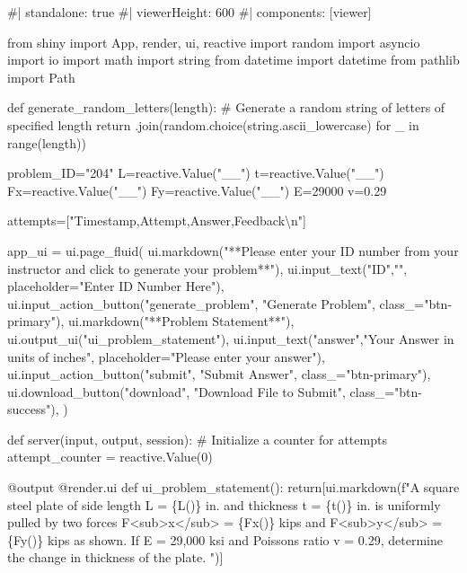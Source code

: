 \documentclass[
  letterpaper,
  DIV=11,
  numbers=noendperiod]{scrreprt}
\newenvironment{Shaded}{\begin{snugshade}}{\end{snugshade}}
\newcommand{\NormalTok}[1]{\textcolor[rgb]{0.00,0.23,0.31}{#1}}
\begin{document}
\begin{Shaded}
\begin{Highlighting}[]
\NormalTok{\#| standalone: true}
\NormalTok{\#| viewerHeight: 600}
\NormalTok{\#| components: [viewer]}

\NormalTok{from shiny import App, render, ui, reactive}
\NormalTok{import random}
\NormalTok{import asyncio}
\NormalTok{import io}
\NormalTok{import math}
\NormalTok{import string}
\NormalTok{from datetime import datetime}
\NormalTok{from pathlib import Path}

\NormalTok{def generate\_random\_letters(length):}
\NormalTok{    \# Generate a random string of letters of specified length}
\NormalTok{    return \textquotesingle{}\textquotesingle{}.join(random.choice(string.ascii\_lowercase) for \_ in range(length)) }

\NormalTok{problem\_ID="204"}
\NormalTok{L=reactive.Value("\_\_")}
\NormalTok{t=reactive.Value("\_\_")}
\NormalTok{Fx=reactive.Value("\_\_")}
\NormalTok{Fy=reactive.Value("\_\_")}
\NormalTok{E=29000}
\NormalTok{v=0.29}


\NormalTok{attempts=["Timestamp,Attempt,Answer,Feedback\textbackslash{}n"]}

\NormalTok{app\_ui = ui.page\_fluid(}
\NormalTok{    ui.markdown("**Please enter your ID number from your instructor and click to generate your problem**"),}
\NormalTok{    ui.input\_text("ID","", placeholder="Enter ID Number Here"),}
\NormalTok{    ui.input\_action\_button("generate\_problem", "Generate Problem", class\_="btn{-}primary"),}
\NormalTok{    ui.markdown("**Problem Statement**"),}
\NormalTok{    ui.output\_ui("ui\_problem\_statement"),}
\NormalTok{    ui.input\_text("answer","Your Answer in units of inches", placeholder="Please enter your answer"),}
\NormalTok{    ui.input\_action\_button("submit", "Submit Answer", class\_="btn{-}primary"),}
\NormalTok{    ui.download\_button("download", "Download File to Submit", class\_="btn{-}success"),}
\NormalTok{)}


\NormalTok{def server(input, output, session):}
\NormalTok{    \# Initialize a counter for attempts}
\NormalTok{    attempt\_counter = reactive.Value(0)}

\NormalTok{    @output}
\NormalTok{    @render.ui}
\NormalTok{    def ui\_problem\_statement():}
\NormalTok{        return[ui.markdown(f"A square steel plate of side length L = \{L()\} in. and thickness t = \{t()\} in. is uniformly pulled by two forces F\textless{}sub\textgreater{}x\textless{}/sub\textgreater{} = \{Fx()\} kips and F\textless{}sub\textgreater{}y\textless{}/sub\textgreater{} = \{Fy()\} kips as shown. If E = 29,000 ksi and Poisson\textquotesingle{}s ratio v = 0.29, determine the change in thickness of the plate. ")]}
    

\end{Highlighting}
\end{Shaded}
\end{document}
